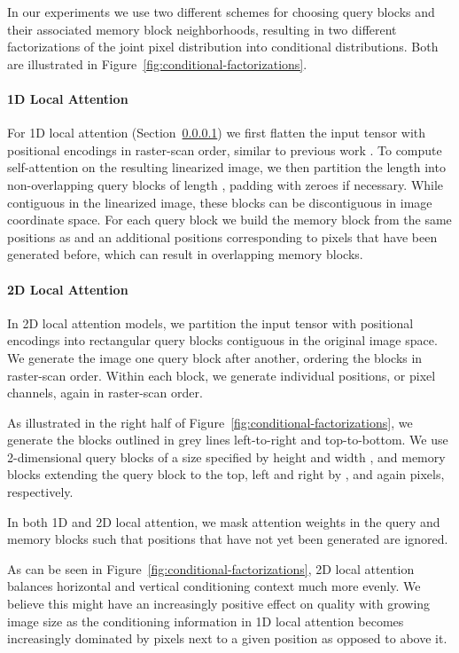 \documentclass{article}
\begin{document}
In our experiments we use two different schemes for choosing query blocks and their associated memory block neighborhoods, resulting in two different factorizations of the joint pixel distribution into conditional distributions. Both are illustrated in Figure~\ref{fig:conditional-factorizations}.



\paragraph{1D Local Attention} \label{sec:loc-1d} 
For 1D local attention (Section~\ref{sec:loc-1d}) we first flatten the input tensor with positional encodings in raster-scan order, similar to previous work \citep{PixelRNN}. To compute self-attention on the resulting linearized image, we then partition the length into non-overlapping query blocks  of length , padding with zeroes if necessary. While contiguous in the linearized image, these blocks can be discontiguous in image coordinate space. For each query block we build the memory block  from the same positions as  and an additional  positions corresponding to pixels that have been generated before, which can result in overlapping memory blocks.

\paragraph{2D Local Attention} \label{sec:loc-2d} In 2D local attention models, we partition the input tensor with positional encodings into rectangular query blocks contiguous in the original image space. We generate the image one query block after another, ordering the blocks in raster-scan order. Within each block, we generate individual positions, or pixel channels, again in raster-scan order.

As illustrated in the right half of Figure~\ref{fig:conditional-factorizations}, we generate the blocks outlined in grey lines left-to-right and top-to-bottom. We use 2-dimensional query blocks of a size  specified by height and width , and memory blocks extending the query block to the top, left and right by ,  and again  pixels, respectively.

In both 1D and 2D local attention, we mask attention weights in the query and memory blocks such that positions that have not yet been generated are ignored.

As can be seen in Figure~\ref{fig:conditional-factorizations}, 2D local attention balances horizontal and vertical conditioning context much more evenly. We believe this might have an increasingly positive effect on quality with growing image size as the conditioning information in 1D local attention becomes increasingly dominated by pixels next to a given position as opposed to above it. 
\end{document}
